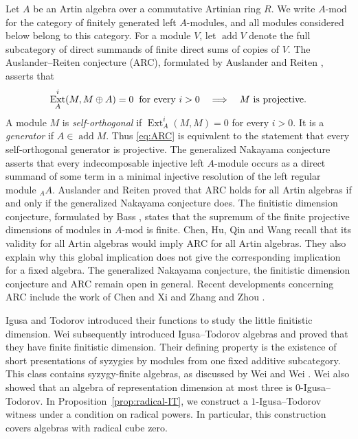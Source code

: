 \documentclass[a4paper,reqno]{amsart}
\numberwithin{equation}{section}
\theoremstyle{definition}
\DeclareMathOperator{\Ext}{Ext}
\DeclareMathOperator{\add}{add}
\newcommand{\modA}{A\text{-}\mathrm{mod}}
\begin{document}
Let $A$ be an Artin algebra over a commutative Artinian ring $R$. We write $\modA$ for the category of finitely generated left $A$-modules, and all modules considered below belong to this category. For a module $V$, let $\add V$ denote the full subcategory of direct summands of finite direct sums of copies of $V$. The Auslander--Reiten conjecture (ARC), formulated by Auslander and Reiten \cite{AR1975}, asserts that
\begin{equation}\label{eq:ARC}
\Ext_A^i(M,M\oplus A)=0\hspace{2mm}\text{for every }i>0
\quad\Longrightarrow\quad M\text{ is projective}.
\end{equation}
A module $M$ is \emph{self-orthogonal} if $\Ext_A^i(M,M)=0$ for every $i>0$. It is a \emph{generator} if $A\in\add M$. Thus \eqref{eq:ARC} is equivalent to the statement that every self-orthogonal generator is projective. The generalized Nakayama conjecture asserts that every indecomposable injective left $A$-module occurs as a direct summand of some term in a minimal injective resolution of the left regular module ${}_AA$. Auslander and Reiten \cite{AR1975} proved that ARC holds for all Artin algebras if and only if the generalized Nakayama conjecture does. The finitistic dimension conjecture, formulated by Bass \cite{Bass1960}, states that the supremum of the finite projective dimensions of modules in $\modA$ is finite. Chen, Hu, Qin and Wang \cite[Introduction]{CHQW2023} recall that its validity for all Artin algebras would imply ARC for all Artin algebras. They also explain why this global implication does not give the corresponding implication for a fixed algebra. The generalized Nakayama conjecture, the finitistic dimension conjecture and ARC remain open in general. Recent developments concerning ARC include the work of Chen and Xi \cite{ChenXi2025} and Zhang and Zhou \cite{ZZ2026}.

Igusa and Todorov \cite{IT2005} introduced their functions to study the little finitistic dimension. Wei \cite[Theorem~2.3]{Wei2009} subsequently introduced Igusa--Todorov algebras and proved that they have finite finitistic dimension. Their defining property is the existence of short presentations of syzygies by modules from one fixed additive subcategory. This class contains syzygy-finite algebras, as discussed by Wei \cite{Wei2009} and Wei \cite[Section~5]{Wei2011}. Wei \cite[Lemma~2.1]{Wei2008} also showed that an algebra of representation dimension at most three is $0$-Igusa--Todorov. In Proposition~\ref{prop:radical-IT}, we construct a $1$-Igusa--Todorov witness under a condition on radical powers. In particular, this construction covers algebras with radical cube zero.
\end{document}
